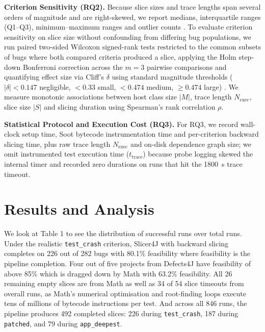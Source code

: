 \documentclass[sigconf,nonacm]{acmart}
\begin{document}
\textbf{Criterion Sensitivity (RQ2).}
Because slice sizes and trace lengths span several orders of magnitude and are right-skewed, we report medians, interquartile ranges (Q1--Q3), minimum--maximum ranges and outlier counts \cite{Wohlin2012Experimentation}. To evaluate criterion sensitivity on slice size without confounding from differing bug populations, we run paired two-sided \newline
Wilcoxon signed-rank tests restricted to the common subsets of bugs where both compared criteria produced a slice, applying the Holm step-down Bonferroni correction across the $m = 3$ pairwise comparisons and quantifying effect size via Cliff's $\delta$ using standard magnitude thresholds ($|\delta| < 0.147$ negligible, $< 0.33$ small, $< 0.474$ medium, $\ge 0.474$ large) \cite{Romano2006Appropriate}. We measure monotonic associations between host class size $|M|$, trace length $N_{\text{exec}}$, slice size $|S|$ and slicing duration using Spearman's rank correlation $\rho$.

\textbf{Statistical Protocol and Execution Cost (RQ3).} 
 For RQ3, we record wall-clock setup time, Soot bytecode instrumentation time and per-criterion backward slicing time, plus raw trace length $N_{\text{exec}}$ and on-disk dependence graph size; we omit instrumented test execution time ($t_{\text{trace}}$) because probe logging skewed the internal timer and recorded zero durations on runs that hit the 1800~s trace timeout.

\section{Results and Analysis}
We look at Table 1 to see the distribution of successful runs over total runs. Under the realistic \texttt{test\_crash} criterion, Slicer4J with backward slicing completes on 226 out of 282 bugs with 80.1\% feasibility where feasibility is the pipeline completion. Four out of five projects from Defects4J have feasibility of above 85\% which is dragged down by Math with 63.2\% feasibility. All 26 remaining empty slices are from Math as well as 34 of 54 slice timeouts from overall runs, as Math's numerical optimisation and root-finding loops execute tens of millions of bytecode instructions per test. And across all 846 runs, the pipeline produces 492 completed slices: 226 during \texttt{test\_crash}, 187 during \texttt{patched}, \newline and 79 during \texttt{app\_deepest}.
\end{document}
